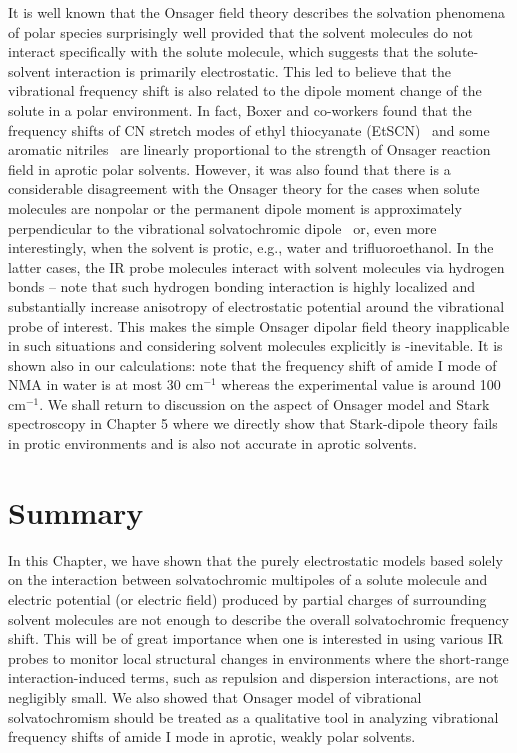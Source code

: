 \documentclass[a4paper,titlepage,twoside,fleqn,12pt]{book}
\begin{document}
\begin{refsection}
It is well known that the Onsager field theory describes
the solvation phenomena of polar species surprisingly
well provided that the solvent molecules do not interact
specifically with the solute molecule, which suggests that the
solute\hyp{}solvent interaction is primarily electrostatic. This led
to believe that the vibrational frequency shift is also related
to the dipole moment change of the solute in a polar
environment. In fact, Boxer and co\hyp{}workers found that the
frequency shifts of CN stretch modes of ethyl thiocyanate
(EtSCN)~\citep{Fafarman.Sigala.Herschlag.Boxer.JACS.2010} 
and some aromatic nitriles~\citep{Levinson.Fried.Boxer.JPCB.2012} 
are linearly proportional
to the strength of Onsager reaction field in aprotic polar
solvents. However, it was also found that there is a considerable
disagreement with the Onsager theory for the cases
when solute molecules are nonpolar or the permanent dipole
moment is approximately perpendicular to the vibrational
solvatochromic dipole~\citep{Levinson.Fried.Boxer.JPCB.2012} 
or, even more interestingly, when
the solvent is protic, e.g., water and trifluoroethanol.\citep{Fafarman.Sigala.Herschlag.Boxer.JACS.2010}  
In
the latter cases, the IR probe molecules interact with solvent
molecules via hydrogen bonds -- note that such hydrogen bonding
interaction is highly localized and substantially
increase anisotropy of electrostatic potential around the vibrational
probe of interest. This makes the simple Onsager
dipolar field theory inapplicable in such situations and considering
solvent molecules explicitly is \hyp{inevitable}. It is shown also in our 
calculations: note that the frequency shift of amide I mode of NMA in water
is at most 30 cm$^{-1}$ whereas the experimental value
is around 100 cm$^{-1}$. We shall return to discussion
on the aspect of Onsager model and Stark spectroscopy in Chapter 5 
where we directly show that Stark\hyp{}dipole
theory fails in protic environments and is also not accurate in aprotic solvents.

\section{Summary}

In this Chapter, we have shown that the purely electrostatic
models based solely on the interaction between
solvatochromic multipoles of a solute molecule and electric
potential (or electric field) produced by partial charges of
surrounding solvent molecules are not enough to describe the
overall solvatochromic frequency shift. This will be of great
importance when one is interested in using various IR probes
to monitor local structural changes in environments where the
short\hyp{}range interaction\hyp{}induced terms, such as repulsion and
dispersion interactions, are not negligibly small.
We also showed that Onsager model of vibrational solvatochromism
should be treated as a qualitative tool in analyzing vibrational
frequency shifts of amide I mode in aprotic, weakly polar solvents.

\printbibliography[heading=subbibintoc,title={References}]
\end{refsection}
\end{document}
